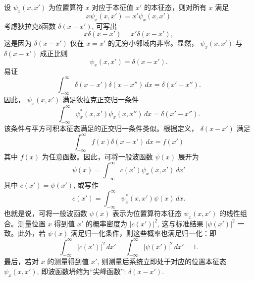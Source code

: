 设 $ \psi_x(x, x') $ 为位置算符 $ x $ 对应于本征值 $ x' $ 的本征态，则对所有 $ x $ 满足
\begin{equation}
	x \psi_x(x, x') = x' \psi_x(x, x')
\end{equation}
考虑狄拉克δ函数 $ \delta(x - x') $, 可写出
\begin{equation}
	x \delta(x - x') = x' \delta(x - x'),
\end{equation}
这是因为 $ \delta(x - x') $ 仅在 $ x = x' $ 的无穷小邻域内非零。显然， $ \psi_{x}(x, x') $ 与 $ \delta(x - x') $ 成正比则
\begin{equation}
	\psi_x(x, x') = \delta(x - x').
\end{equation}
易证
\begin{equation}
	\int_{-\infty}^{\infty} \delta(x - x') \delta(x - x'') \, dx = \delta(x' - x''). 
\end{equation}
因此， $ \psi_{x}(x, x') $ 满足狄拉克正交归一条件
\begin{equation}
	\int_{-\infty}^{\infty} \psi_x^*(x, x') \psi_x(x, x'') \, dx = \delta(x' - x''). \label{eq:m3}
\end{equation}
该条件与平方可积本征态满足的正交归一条件类似。根据定义， $ \delta(x - x') $ 满足
\begin{equation}
	\int_{-\infty}^{\infty} f(x) \delta(x - x') \, dx = f(x')
\end{equation}
其中 $ f(x) $ 为任意函数。因此，可将一般波函数 $ \psi(x) $ 展开为
\begin{equation}
	\psi(x) = \int_{-\infty}^{\infty} c(x') \psi_{x}(x, x') \, dx'
\end{equation}
其中 $ c(x') = \psi(x') $, 或写作
\begin{equation}
	c(x') = \int_{-\infty}^{\infty} \psi_x^*(x, x') \psi(x) \, dx. 
\end{equation}
也就是说，可将一般波函数 $ \psi(x) $ 表示为位置算符本征态 $ \psi_{x}(x, x') $ 的线性组合。测量位置 $ x $ 得到值 $ x' $ 的概率密度为 $ |c(x')|^{2} $, 这与标准结果 $ |\psi(x')|^{2} $ 一致。此外，若 $ \psi(x) $ 满足归一化条件，则这些概率也满足归一化：即
\begin{equation}
	\int_{-\infty}^{\infty} |c(x')|^2 \, dx' = \int_{-\infty}^{\infty} |\psi(x')|^2 \, dx' = 1. 
\end{equation}
最后，若对 $ x $ 的测量得到值 $ x' $, 则测量后系统立即处于对应的位置本征态 $ \psi_{x}(x, x') $, 即波函数坍缩为“尖峰函数”: $ \delta(x - x') $.  

